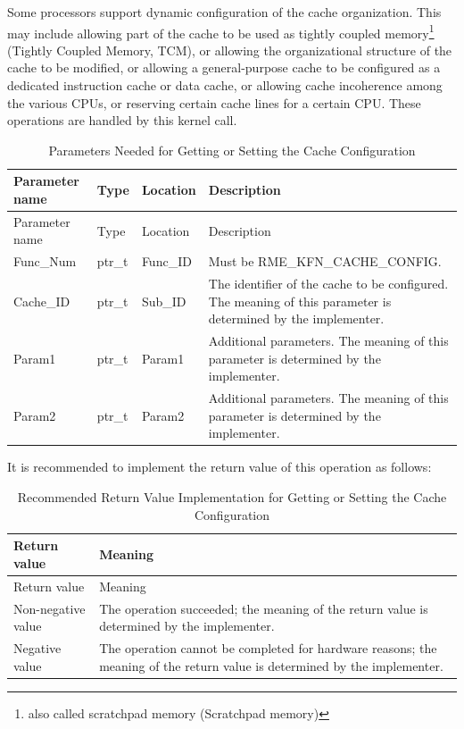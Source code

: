 Some processors support dynamic configuration of the cache organization. This may include allowing part of the cache to be used as tightly coupled memory\footnote{also called scratchpad memory (Scratchpad memory)} (Tightly
Coupled Memory,
TCM), or allowing the organizational structure of the cache to be modified, or allowing a general-purpose cache to be configured as a dedicated instruction cache or data cache, or allowing cache incoherence among the various CPUs, or reserving certain cache lines for a certain CPU. These operations are handled by this kernel call.

\begin{xltabular}{\textwidth}{@{}>{\hsize\raggedright\arraybackslash}X>{\hsize\raggedright\arraybackslash}X>{\hsize\raggedright\arraybackslash}X>{\hsize\raggedright\arraybackslash}X@{}}
\caption{Parameters Needed for Getting or Setting the Cache Configuration}\label{tab:8-27-get-or-set-cache-configuration-parameters}\\
\toprule
Parameter name & Type & Location & Description\tabularnewline
\endfirsthead
\toprule
Parameter name & Type & Location & Description\tabularnewline
\midrule
\endhead
\bottomrule
\endlastfoot
Func\_Num & ptr\_t & Func\_ID & Must be RME\_KFN\_CACHE\_CONFIG.\tabularnewline
Cache\_ID & ptr\_t & Sub\_ID &
The identifier of the cache to be configured. The meaning of this parameter is determined by the implementer.\tabularnewline
Param1 & ptr\_t & Param1 &
Additional parameters. The meaning of this parameter is determined by the implementer.\tabularnewline
Param2 & ptr\_t & Param2 &
Additional parameters. The meaning of this parameter is determined by the implementer.\tabularnewline
\end{xltabular}
\nopagebreak[4]

It is recommended to implement the return value of this operation as follows:

\begin{xltabular}{\textwidth}{@{}>{\hsize\raggedright\arraybackslash}X>{\hsize\raggedright\arraybackslash}X@{}}
\caption{Recommended Return Value Implementation for Getting or Setting the Cache Configuration}\label{tab:8-28-get-or-set-cache-configuration-suggested-return-values}\\
\toprule
Return value & Meaning\tabularnewline
\endfirsthead
\toprule
Return value & Meaning\tabularnewline
\midrule
\endhead
\bottomrule
\endlastfoot
    Non-negative value & The operation succeeded; the meaning of the return value is determined by the implementer.\tabularnewline
    Negative value & The operation cannot be completed for hardware reasons; the meaning of the return value is determined by the implementer.\tabularnewline
\end{xltabular}
\nopagebreak[4]

